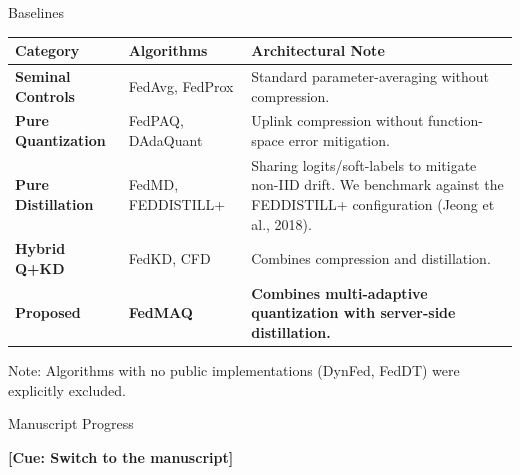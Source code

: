 \documentclass[11pt, aspectratio=169]{beamer}
\begin{document}
\begin{frame}{Baselines}
    \centering
    \vspace{0.2cm}
    \begin{table}
        \fontsize{8pt}{10pt}\selectfont
        \begin{tabular}{l l p{6.5cm}}
            \toprule
            \textbf{Category}          & \textbf{Algorithms} & \textbf{Architectural Note}                                                                                                    \\
            \midrule
            \textbf{Seminal Controls}  & FedAvg, FedProx     & Standard parameter-averaging without compression.                                                                              \\
            \midrule
            \textbf{Pure Quantization} & FedPAQ, DAdaQuant   & Uplink compression without function-space error mitigation.                                                                    \\
            \midrule
            \textbf{Pure Distillation} & FedMD, FEDDISTILL+  & Sharing logits/soft-labels to mitigate non-IID drift. We benchmark against the FEDDISTILL+ configuration (Jeong et al., 2018). \\
            \midrule
            \textbf{Hybrid Q+KD}       & FedKD, CFD          & Combines compression and distillation.                                                                                         \\
            \midrule
            \textbf{Proposed}          & \textbf{FedMAQ}     & \textbf{Combines multi-adaptive quantization with server-side distillation.}                                                   \\
            \bottomrule
        \end{tabular}
    \end{table}
    \vfill
    {\fontsize{8pt}{9.5pt}\selectfont *Note: Algorithms with no public implementations (DynFed, FedDT) were explicitly excluded.}
\end{frame}

\begin{frame}{Manuscript Progress}
    \begin{center}
        \textbf{[Cue: Switch to the manuscript]}
    \end{center}
\end{frame}
\end{document}
